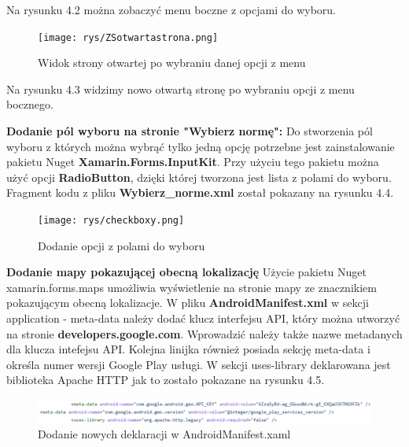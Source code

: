 Na rysunku 4.2 można zobaczyć menu boczne z opcjami do wyboru.


\begin{figure}[!htb]
	\begin{center}
		\texttt{[image: rys/ZSotwartastrona.png]}
		\caption{Widok strony otwartej po wybraniu danej opcji z menu}
		\label{rys:rysunek014}
	\end{center}
\end{figure}

Na rysunku 4.3 widzimy nowo otwartą stronę po wybraniu opcji z menu bocznego.

 \textbf{Dodanie pól wyboru na stronie "Wybierz normę":} \newline
 Do stworzenia pól wyboru z których można wybrąć tylko jedną opcję potrzebne jest zainstalowanie pakietu Nuget \textbf{Xamarin.Forms.InputKit}. Przy użyciu tego pakietu można użyć opcji \textbf{RadioButton}, dzięki której tworzona jest lista z polami do wyboru. \newline \newline
 Fragment kodu z pliku \textbf{Wybierz\_norme.xml} został pokazany na rysunku 4.4. \newline
 \begin{figure}[!htb]
 	\begin{center}
 		\texttt{[image: rys/checkboxy.png]}
 		\caption{Dodanie opcji z polami do wyboru}
 		\label{rys:rysunek015}
 	\end{center}
 \end{figure}
 

 \textbf{Dodanie mapy pokazującej obecną lokalizację}
 \newline
 Użycie pakietu Nuget xamarin.forms.maps umożliwia wyświetlenie na stronie mapy ze znacznikiem pokazującym obecną lokalizacje.
 \newline 
 W pliku \textbf{AndroidManifest.xml} w sekcji application - meta-data należy dodać klucz interfejsu API, który można utworzyć na stronie \textbf{developers.google.com}. Wprowadzić należy także nazwe metadanych dla klucza intefejsu API.
 Kolejna linijka również posiada sekcję meta-data i określa numer wersji Google Play usługi. W sekcji uses-library deklarowana jest biblioteka Apache HTTP jak to zostało pokazane na rysunku 4.5.

 \begin{figure}[!htb]
 	\begin{center}
 		\includegraphics[width=18cm]{rys/map_manifest.png}
 		\caption{Dodanie nowych deklaracji w AndroidManifest.xaml}
 		\label{rys:rysunek016}
 	\end{center}
 \end{figure}
 

